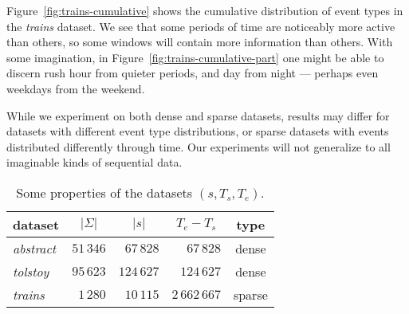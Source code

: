 Figure~\ref{fig:trains-cumulative} shows the cumulative distribution of event types in the \emph{trains} dataset. We see that some periods of time are noticeably more active than others, so some windows will contain more information than others. With some imagination, in Figure~\ref{fig:trains-cumulative-part} one might be able to discern rush hour from quieter periods, and day from night --- perhaps even weekdays from the weekend.

While we experiment on both dense and sparse datasets, results may differ for datasets with different event type distributions, or sparse datasets with events distributed differently through time. Our experiments will not generalize to all imaginable kinds of sequential data.

\begin{table}[t]
\centering

\begin{tabulary}{\textwidth}{ L|RRRC }

dataset &  &  &  & type \\
\hline
\emph{abstract} & $ 51\,346 $ & $ 67\,828 $ & $ 67\,828 $ & dense \\
\emph{tolstoy} & $ 95\,623 $ & $ 124\,627 $ & $ 124\,627 $ & dense \\
\emph{trains} & $ 1\,280 $ & $ 10\,115 $ & $ 2\,662\,667 $ & sparse \\

\end{tabulary}

\caption{Some properties of the datasets $ (s, T_s, T_e) $.}
\label{table:datasets-numbers}
\end{table}
